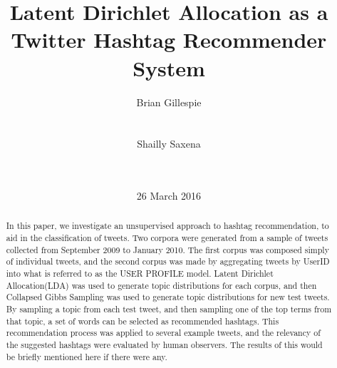 \documentclass{acm_proc_article-sp}
\begin{document}
\title{Latent Dirichlet Allocation as a Twitter Hashtag Recommender System
	}



\author{
\alignauthor
Brian Gillespie\\
       \\
       \\
\alignauthor
Shailly Saxena\\
       \\
       \\
}

\date{26 March 2016}



\maketitle
\begin{abstract}
\hspace*{5mm}In this paper, we investigate an unsupervised approach to hashtag recommendation, to aid in the classification of tweets. Two corpora were generated from a sample of tweets collected from September 2009 to January 2010. The first corpus was composed simply of individual tweets, and the second corpus was made by aggregating tweets by UserID into what is referred to as the USER PROFILE model. Latent Dirichlet Allocation(LDA) was used to generate topic distributions for each corpus, and then Collapsed Gibbs Sampling was used to generate topic distributions for new test tweets. By sampling a topic from each test tweet, and then sampling one of the top terms from that topic, a set of words can be selected as recommended hashtags. This recommendation process was applied to several example tweets, and the relevancy of the suggested hashtags were evaluated by human observers. The results of this would be briefly mentioned here if there were any.
\end{abstract}

\end{document}
